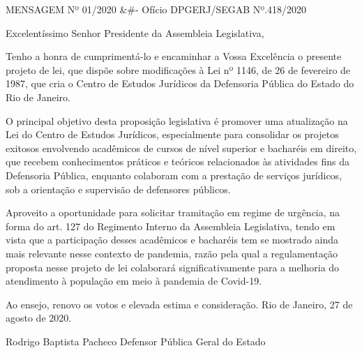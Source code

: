 \documentclass[10pt]{article}
\begin{document}
  MENSAGEM Nº 01/2020 &#- Ofício DPGERJ/SEGAB Nº.418/2020



Excelentíssimo Senhor Presidente da Assembleia Legislativa,


Tenho a honra de cumprimentá-lo e encaminhar a Vossa Excelência o presente projeto de lei, que dispõe sobre modificações à Lei nº 1146, de 26 de fevereiro de 1987, que cria o Centro de Estudos Jurídicos da Defensoria Pública do Estado do Rio de Janeiro.

O principal objetivo desta proposição legislativa é promover uma atualização na Lei do Centro de Estudos Jurídicos, especialmente para consolidar os projetos exitosos envolvendo acadêmicos de cursos de nível superior e bacharéis em direito, que recebem conhecimentos práticos e teóricos relacionados às atividades fins da Defensoria Pública, enquanto colaboram com a prestação de serviços jurídicos, sob a orientação e supervisão de defensores públicos.

Aproveito a oportunidade para solicitar tramitação em regime de urgência, na forma do art. 127 do Regimento Interno da Assembleia Legislativa, tendo em vista que a participação desses acadêmicos e bacharéis tem se mostrado ainda mais relevante nesse contexto de pandemia, razão pela qual a regulamentação proposta nesse projeto de lei colaborará significativamente para a melhoria do atendimento à população em meio à pandemia de Covid-19.

Ao ensejo, renovo os votos e elevada estima e consideração.
Rio de Janeiro, 27 de agosto de 2020.


Rodrigo Baptista Pacheco
Defensor Pública Geral do Estado
\end{document}

